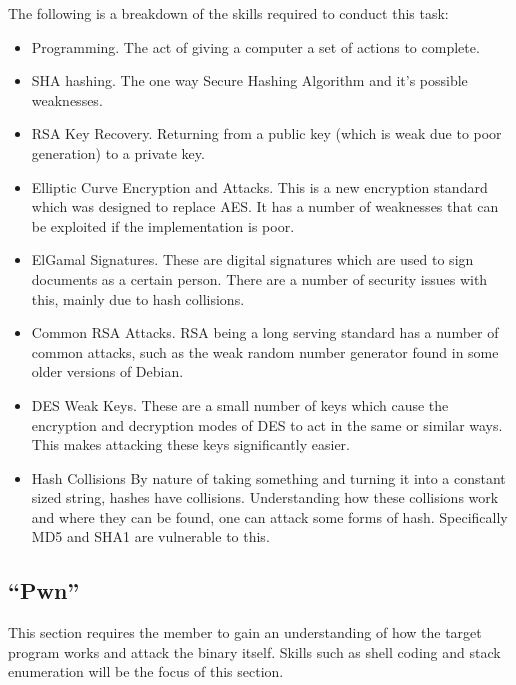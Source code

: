 \documentclass[a4paper,11pt]{report}
\begin{document}
			The following is a breakdown of the skills required to conduct this task:
			\begin{itemize}
				\item Programming.
					The act of giving a computer a set of actions to complete. 
				\item SHA hashing. 
					The one way Secure Hashing Algorithm and it's possible weaknesses. 
				\item RSA Key Recovery.
					Returning from a public key (which is weak due to poor generation) to a private key. 
				\item Elliptic Curve Encryption and Attacks.
					This is a new encryption standard which was designed to replace AES. 
					It has a number of weaknesses that can be exploited if the implementation is poor. 
				\item ElGamal Signatures.
					These are digital signatures which are used to sign documents as a certain person. 
					There are a number of security issues with this, mainly due to hash collisions. 
				\item Common RSA Attacks. 
					RSA being a long serving standard has a number of common attacks, such as the weak random number generator found in some older versions of Debian. 
				\item DES Weak Keys. 
					These are a small number of keys which cause the encryption and decryption modes of DES to act in the same or similar ways. 
					This makes attacking these keys significantly easier. 
				\item Hash Collisions
					By nature of taking something and turning it into a constant sized string, hashes have collisions. 
					Understanding how these collisions work and where they can be found, one can attack some forms of hash. 
					Specifically MD5 and SHA1 are vulnerable to this. 
			\end{itemize}
		\subsection{``Pwn''}
			This section requires the member to gain an understanding of how the target program works and attack the binary itself. 
			Skills such as shell coding and stack enumeration will be the focus of this section. 
\end{document}
